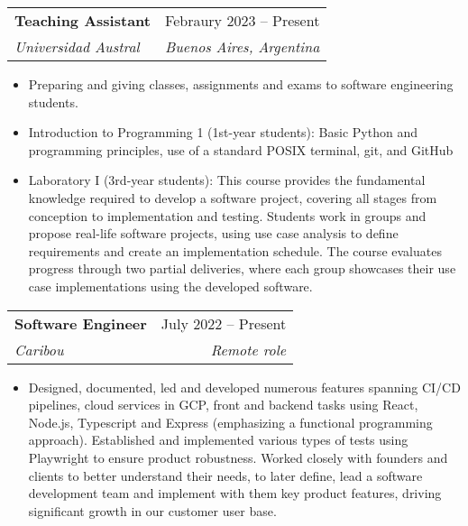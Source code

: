\documentclass[letterpaper,11pt]{article}
\makeatletter
\newcommand{\resumeItem}[1]{
  \item\small{
    {#1 \vspace{-2pt}}
  }
}
\newcommand{\resumeSubheading}[4]{
  \vspace{-2pt}\item
    \begin{tabular*}{0.97\textwidth}[t]{l@{\extracolsep{\fill}}r}
      \textbf{#1} & #2 \\
      \textit{\small#3} & \textit{\small #4} \\
    \end{tabular*}\vspace{-7pt}
}
\newcommand{\resumeSubSubheading}[2]{
    \item
    \begin{tabular*}{0.97\textwidth}{l@{\extracolsep{\fill}}r}
      \textit{\small#1} & \textit{\small #2} \\
    \end{tabular*}\vspace{-7pt}
}
\newcommand{\resumeSubHeadingListEnd}{\end{itemize}}
\newcommand{\resumeItemListStart}{\begin{itemize}}
\newcommand{\resumeItemListEnd}{\end{itemize}\vspace{-5pt}}
\makeatother
\begin{document}
    \resumeSubheading
      {Teaching Assistant}{Febraury 2023 -- Present}
      {Universidad Austral}{Buenos Aires, Argentina}
      \resumeItemListStart
        \resumeItem{Preparing and giving classes, assignments and exams to software engineering students.}
        \resumeItem{Introduction to Programming 1 (1st-year students): Basic Python and programming principles, use of a standard POSIX terminal, git, and GitHub}
        \resumeItem{Laboratory I (3rd-year students):
        This course provides the fundamental knowledge required to develop a software project, covering all stages from conception to implementation and testing. Students work in groups and propose real-life software projects, using use case analysis to define requirements and create an implementation schedule. The course evaluates progress through two partial deliveries, where each group showcases their use case implementations using the developed software.}
        \resumeItemListEnd
    \resumeSubheading
      {Software Engineer}{July 2022 -- Present}
      {Caribou}{Remote role}
      \resumeItemListStart
        \resumeItem{Designed, documented, led and developed numerous features spanning CI/CD pipelines, cloud services in GCP, front and backend tasks using React, Node.js, Typescript and Express (emphasizing a functional programming approach). Established and implemented various types of tests using Playwright to ensure product robustness. Worked closely with founders and clients to better understand their needs, to later define, lead a software development team and implement with them key product features, driving significant growth in our customer user base.}
      \resumeItemListEnd
      
\end{document}

